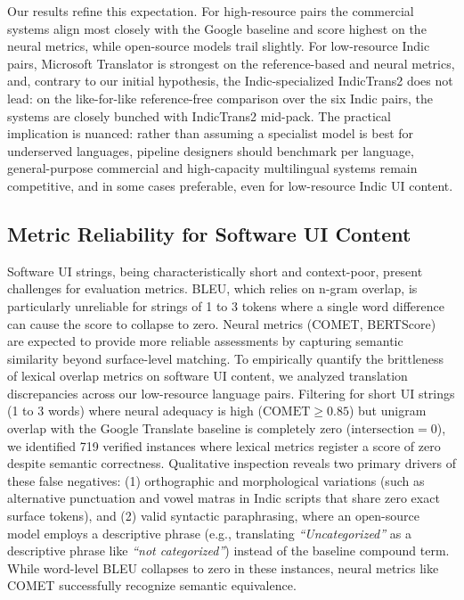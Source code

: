 \documentclass[pdflatex,sn-mathphys-num]{sn-jnl}
\begin{document}
Our results refine this expectation. For high-resource pairs the commercial systems align most closely with the Google baseline and score highest on the neural metrics, while open-source models trail slightly. For low-resource Indic pairs, Microsoft Translator is strongest on the reference-based and neural metrics, and, contrary to our initial hypothesis, the Indic-specialized IndicTrans2 does not lead: on the like-for-like reference-free comparison over the six Indic pairs, the systems are closely bunched with IndicTrans2 mid-pack. The practical implication is nuanced: rather than assuming a specialist model is best for underserved languages, pipeline designers should benchmark per language, general-purpose commercial and high-capacity multilingual systems remain competitive, and in some cases preferable, even for low-resource Indic UI content.

\subsection{Metric Reliability for Software UI Content}

Software UI strings, being characteristically short and context-poor, present challenges for evaluation metrics. BLEU, which relies on n-gram overlap, is particularly unreliable for strings of 1 to 3 tokens where a single word difference can cause the score to collapse to zero. Neural metrics (COMET, BERTScore) are expected to provide more reliable assessments by capturing semantic similarity beyond surface-level matching. To empirically quantify the brittleness of lexical overlap metrics on software UI content, we analyzed translation discrepancies across our low-resource language pairs. Filtering for short UI strings (1 to 3 words) where neural adequacy is high ($\text{COMET} \ge 0.85$) but unigram overlap with the Google Translate baseline is completely zero ($\text{intersection} = 0$), we identified 719 verified instances where lexical metrics register a score of zero despite semantic correctness. Qualitative inspection reveals two primary drivers of these false negatives: (1) orthographic and morphological variations (such as alternative punctuation and vowel matras in Indic scripts that share zero exact surface tokens), and (2) valid syntactic paraphrasing, where an open-source model employs a descriptive phrase (e.g., translating \textit{``Uncategorized''} as a descriptive phrase like \textit{``not categorized''}) instead of the baseline compound term. While word-level BLEU collapses to zero in these instances, neural metrics like COMET successfully recognize semantic equivalence.
\end{document}
